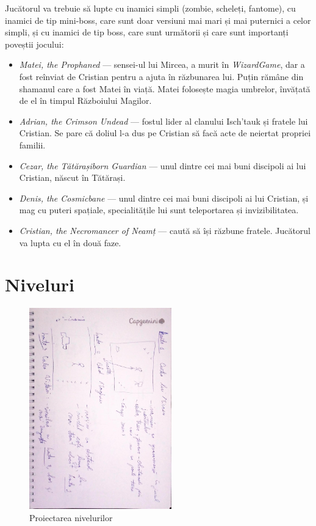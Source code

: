 \documentclass{article}
\begin{document}
    Jucătorul va trebuie să lupte cu inamici simpli (zombie, scheleți, fantome), cu inamici de tip
    mini-boss, care sunt doar versiuni mai mari și mai puternici a celor simpli, și cu inamici de
    tip boss, care sunt următorii și care sunt importanți poveștii jocului:
    \begin{itemize}
        \item \emph{Matei, the Prophaned} --- sensei-ul lui Mircea, a murit în \emph{WizardGame}, dar a
        fost reînviat de Cristian pentru a ajuta în răzbunarea lui. Puțin rămâne din shamanul care
        a fost Matei în viață. Matei folosește magia umbrelor, învățată de el în timpul Războiului Magilor.
        \item \emph{Adrian, the Crimson Undead} --- fostul lider al clanului Isch'tauk și fratele
        lui Cristian. Se pare că doliul l-a dus pe Cristian să facă acte de neiertat propriei familii.
        \item \emph{Cezar, the Tătărașiborn Guardian} --- unul dintre cei mai buni discipoli ai lui
        Cristian, născut în Tătărași.
        \item \emph{Denis, the Cosmicbane} --- unul dintre cei mai buni discipoli ai lui Cristian, și
        mag cu puteri spațiale, specialitățile lui sunt teleportarea și invizibilitatea.
        \item \emph{Cristian, the Necromancer of Neamț} --- caută să își răzbune fratele. Jucătorul va
        lupta cu el în două faze.
    \end{itemize}


    \section{Niveluri}

    \begin{figure}[h]
        \includegraphics[width=0.55\textwidth, angle=90]{designing-levels}
        \centering
        \caption{Proiectarea nivelurilor}
    \end{figure}
\end{document}

